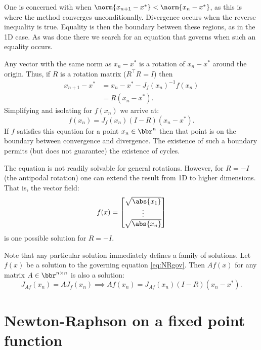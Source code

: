 \documentclass{article}
\begin{document}

One is concerned with when $\norm{x_{n+1} - x^*} < \norm{x_n - x^*}$, as this is where the method converges unconditionally.
Divergence occurs when the reverse inequality is true.
Equality is then the boundary between these regions, as in the 1D case.
As was done there we search for an equation that governs when such an equality occurs.

Any vector with the same norm as $x_n - x^*$ is a rotation of $x_n - x^*$ around the origin.
Thus, if $R$ is a rotation matrix ($R^\top R = I$) then
\begin{align*}
	x_{n+1} - x^* & = x_n - x^* - J_f(x_n)^{-1} f(x_n) \\
				  & = R ( x_n - x^* ).
\end{align*}
Simplifying and isolating for $f(x_n)$ we arrive at:
\begin{equation} \label{eq:NRgov}
f(x_n) = J_f(x_n) (I - R) (x_n - x^*).
\end{equation}
If $f$ satisfies this equation for a point $x_n \in \bbr^n$ then that point is on the boundary between convergence and divergence.
The existence of such a boundary permits (but does not guarantee) the existence of cycles.

The equation is not readily solvable for general rotations.
However, for $R = -I$ (the antipodal rotation) one can extend the result from 1D to higher dimensions.
That is, the vector field:
\begin{equation*}
	f(x) = \begin{bmatrix}
	\sqrt{\abs{x_1}} \\ \vdots \\ \sqrt{\abs{x_n}}
	\end{bmatrix}
\end{equation*}
is one possible solution for $R = -I$.

Note that any particular solution immediately defines a family of solutions.
Let $f(x)$ be a solution to the governing equation \ref{eq:NRgov}.
Then $A f(x)$ for any matrix $A \in \bbr^{n \times n}$ is also a solution:
\begin{equation*}
	J_{Af}(x_n) = A J_f(x_n) \implies Af(x_n) = J_{Af}(x_n) (I-R) (x_n - x^*).
\end{equation*}

\section{Newton-Raphson on a fixed point function}
\label{sec:nrfp}
\end{document}
